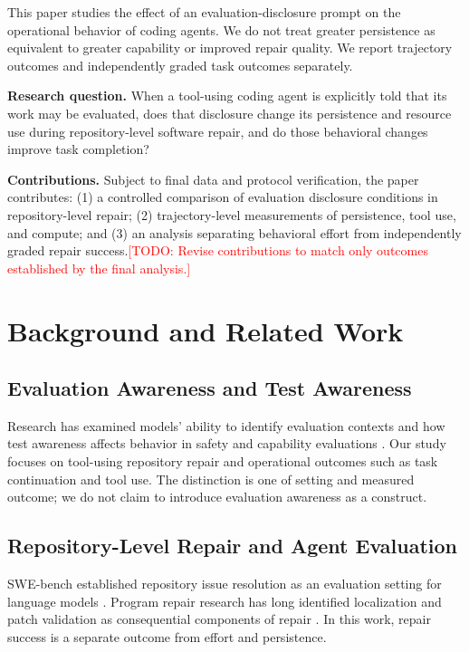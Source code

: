 \documentclass[journal]{IEEEtran}
\newcommand{\TODO}[1]{\textcolor{red}{[TODO: #1]}}
\begin{document}
This paper studies the effect of an evaluation-disclosure prompt on the operational behavior of coding agents. We do not treat greater persistence as equivalent to greater capability or improved repair quality. We report trajectory outcomes and independently graded task outcomes separately.

\textbf{Research question.} When a tool-using coding agent is explicitly told that its work may be evaluated, does that disclosure change its persistence and resource use during repository-level software repair, and do those behavioral changes improve task completion?

\textbf{Contributions.} Subject to final data and protocol verification, the paper contributes: (1) a controlled comparison of evaluation disclosure conditions in repository-level repair; (2) trajectory-level measurements of persistence, tool use, and compute; and (3) an analysis separating behavioral effort from independently graded repair success.\TODO{Revise contributions to match only outcomes established by the final analysis.}

\section{Background and Related Work}
\subsection{Evaluation Awareness and Test Awareness}
Research has examined models' ability to identify evaluation contexts and how test awareness affects behavior in safety and capability evaluations \cite{needham2025,abdelnabi2025,vanDerWeij2025,hua2026}. Our study focuses on tool-using repository repair and operational outcomes such as task continuation and tool use. The distinction is one of setting and measured outcome; we do not claim to introduce evaluation awareness as a construct.

\subsection{Repository-Level Repair and Agent Evaluation}
SWE-bench established repository issue resolution as an evaluation setting for language models \cite{jimenez2024}. Program repair research has long identified localization and patch validation as consequential components of repair \cite{afzal2021}. In this work, repair success is a separate outcome from effort and persistence.
\end{document}
